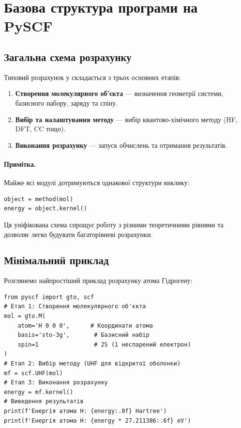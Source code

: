 \section{Базова структура програми на PySCF}

\subsection{Загальна схема розрахунку}

Типовий розрахунок у \PySCF{} складається з трьох основних етапів:

\begin{enumerate}
    \item \textbf{Створення молекулярного об'єкта} --- визначення геометрії системи, базисного набору, заряду та спіну.
    \item \textbf{Вибір та налаштування методу} --- вибір квантово-хімічного методу (HF, DFT, CC тощо).
    \item \textbf{Виконання розрахунку} --- запуск обчислень та отримання результатів.
\end{enumerate}

\paragraph{Примітка.}
Майже всі модулі \PySCF{} дотримуються однакової структури виклику:
\begin{verbatim}
object = method(mol)
energy = object.kernel()
\end{verbatim}
Ця уніфікована схема спрощує роботу з різними теоретичними рівнями та дозволяє легко будувати багаторівневі розрахунки.

\subsection{Мінімальний приклад}

Розглянемо найпростіший приклад розрахунку атома Гідрогену:

\begin{verbatim}
from pyscf import gto, scf
# Етап 1: Створення молекулярного об'єкта
mol = gto.M(
    atom='H 0 0 0',      # Координати атома
    basis='sto-3g',       # Базисний набір
    spin=1                # 2S (1 неспарений електрон)
)
# Етап 2: Вибір методу (UHF для відкритої оболонки)
mf = scf.UHF(mol)
# Етап 3: Виконання розрахунку
energy = mf.kernel()
# Виведення результатів
print(f'Енергія атома H: {energy:.8f} Hartree')
print(f'Енергія атома H: {energy * 27.211386:.6f} eV')
\end{verbatim}

